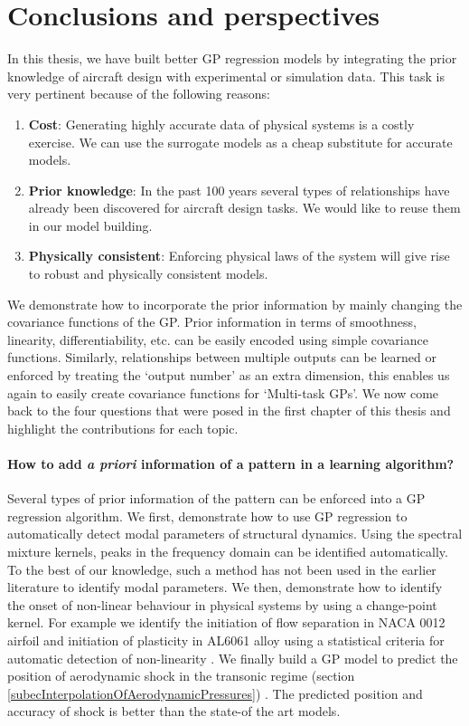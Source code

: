 \chapter{Conclusions and perspectives}
\label{chapConclusions}

In this thesis, we have built better GP regression models by integrating the prior knowledge of aircraft design with experimental or simulation data. This task is very pertinent because of the following reasons:

\begin{enumerate}
\item \textbf{Cost}: Generating highly accurate data of physical systems is a costly exercise. We can use the surrogate models as a cheap substitute for accurate models.
\item \textbf{Prior knowledge}: In the past 100 years several types of relationships have already been discovered for aircraft design tasks. We would like to reuse them in our model building. 
\item \textbf{Physically consistent}: Enforcing physical laws of the system will give rise to robust and physically consistent models.
\end{enumerate}

We demonstrate how to incorporate the prior information by mainly changing the covariance functions of the GP. Prior information in terms of smoothness, linearity, differentiability, etc. can be easily encoded using simple covariance functions. Similarly, relationships between multiple outputs can be learned or enforced by treating the `output number' as an extra dimension, this enables us again to easily create covariance functions for `Multi-task GPs'. We now come back to the four questions that were posed in the first chapter of this thesis and highlight the contributions for each topic.

\subsubsection*{How to add \textit{a priori} information of a pattern in a learning algorithm?}
Several types of prior information of the pattern can be enforced into a GP regression algorithm. We first,  demonstrate how to use GP regression to automatically detect modal parameters of structural dynamics. Using the spectral mixture kernels, peaks in the frequency domain can be identified automatically. To the best of our knowledge, such a method has not been used in the earlier literature to identify modal parameters. We then, demonstrate how to identify the onset of non-linear behaviour in physical systems by using a change-point kernel. For example we identify the initiation of flow separation in NACA 0012 airfoil and initiation of plasticity in AL6061 alloy using a statistical criteria for automatic detection of non-linearity \cite{chiplunkar:hal-01555401}. We finally build a GP model to predict the position of aerodynamic shock in the transonic regime (section \ref{subecInterpolationOfAerodynamicPressures}) \cite{oatao18004}. The predicted position and accuracy of shock is better than the state-of the art models. 
